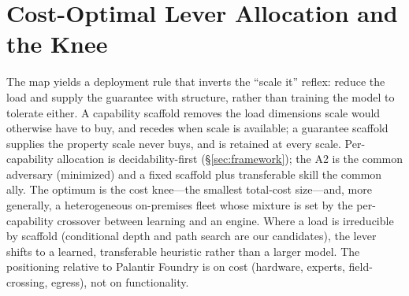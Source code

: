 \section{Cost-Optimal Lever Allocation and the Knee}\label{sec:knee}
The map yields a deployment rule that inverts the ``scale it'' reflex: reduce the load and supply the guarantee with structure, rather than training the model to tolerate either. A capability scaffold removes the load dimensions scale would otherwise have to buy, and recedes when scale is available; a guarantee scaffold supplies the property scale never buys, and is retained at every scale. Per-capability allocation is decidability-first (\S\ref{sec:framework}); the A2 is the common adversary (minimized) and a fixed scaffold plus transferable skill the common ally. The optimum is the cost knee---the smallest total-cost size---and, more generally, a heterogeneous on-premises fleet whose mixture is set by the per-capability crossover between learning and an engine. Where a load is irreducible by scaffold (conditional depth and path search are our candidates), the lever shifts to a learned, transferable heuristic rather than a larger model. The positioning relative to Palantir Foundry is on cost (hardware, experts, field-crossing, egress), not on functionality.
